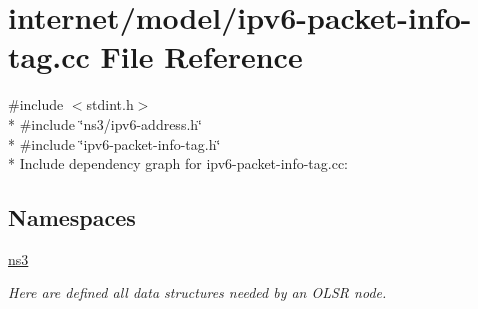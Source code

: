 \hypertarget{ipv6-packet-info-tag_8cc}{}\section{internet/model/ipv6-\/packet-\/info-\/tag.cc File Reference}
\label{ipv6-packet-info-tag_8cc}
{\ttfamily \#include $<$stdint.\+h$>$}\\*
{\ttfamily \#include \char`\"{}ns3/ipv6-\/address.\+h\char`\"{}}\\*
{\ttfamily \#include \char`\"{}ipv6-\/packet-\/info-\/tag.\+h\char`\"{}}\\*
Include dependency graph for ipv6-\/packet-\/info-\/tag.cc\+:
\subsection*{Namespaces}
\begin{DoxyCompactItemize}
\item 
 \hyperlink{namespacens3}{ns3}
\begin{DoxyCompactList}\small\item\em Here are defined all data structures needed by an O\+L\+SR node. \end{DoxyCompactList}\end{DoxyCompactItemize}
